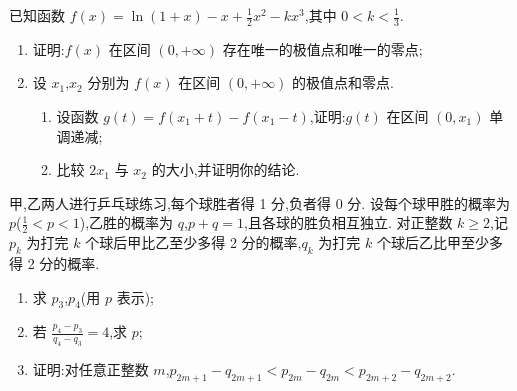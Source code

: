 \begin{problem}
已知函数 \(f(x)=\ln(1+x)-x+\frac12x^2-kx^3\),其中 \(0<k<\frac13\).
\begin{enumerate}
\item 证明:\(f(x)\) 在区间 \((0,+\infty)\) 存在唯一的极值点和唯一的零点;
\item 设 \(x_1\),\(x_2\) 分别为 \(f(x)\) 在区间 \((0,+\infty)\) 的极值点和零点.
    \begin{enumerate}
    \item 设函数 \(g(t)=f(x_1+t)-f(x_1-t)\),证明:\(g(t)\) 在区间 \((0,x_1)\) 单调递减;
    \item 比较 \(2x_1\) 与 \(x_2\) 的大小,并证明你的结论.
    \end{enumerate}
\end{enumerate}
\end{problem}

\begin{problem}
甲,乙两人进行乒乓球练习,每个球胜者得 1 分,负者得 0 分. 设每个球甲胜的概率为 \(p\)(\(\frac12<p<1\)),乙胜的概率为 \(q\),\(p+q=1\),且各球的胜负相互独立. 对正整数 \(k\ge 2\),记 \(p_k\) 为打完 \(k\) 个球后甲比乙至少多得 2 分的概率,\(q_k\) 为打完 \(k\) 个球后乙比甲至少多得 2 分的概率.
\begin{enumerate}
\item 求 \(p_3\),\(p_4\)(用 \(p\) 表示);
\item 若 \(\frac{p_4-p_3}{q_4-q_3}=4\),求 \(p\);
\item 证明:对任意正整数 \(m\),\(p_{2m+1}-q_{2m+1}<p_{2m}-q_{2m}<p_{2m+2}-q_{2m+2}\).
\end{enumerate}
\end{problem}

